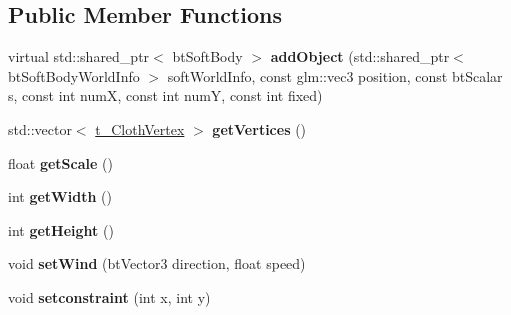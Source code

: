 \subsection*{Public Member Functions}
\begin{DoxyCompactItemize}
\item 
virtual std\+::shared\+\_\+ptr$<$ bt\+Soft\+Body $>$ {\bfseries add\+Object} (std\+::shared\+\_\+ptr$<$ bt\+Soft\+Body\+World\+Info $>$ soft\+World\+Info, const glm\+::vec3 position, const bt\+Scalar s, const int numX, const int numY, const int fixed)\hypertarget{class_physics_1_1_cloth_physic_object_a78923cc91aae2576f71de7e1cfc1ef2b}{}\label{class_physics_1_1_cloth_physic_object_a78923cc91aae2576f71de7e1cfc1ef2b}

\item 
std\+::vector$<$ \hyperlink{struct_physics_1_1_physic_object_1_1t___cloth_vertex}{t\+\_\+\+Cloth\+Vertex} $>$ {\bfseries get\+Vertices} ()\hypertarget{class_physics_1_1_cloth_physic_object_a16c6ad9efd297a4f130bb4b91da4688f}{}\label{class_physics_1_1_cloth_physic_object_a16c6ad9efd297a4f130bb4b91da4688f}

\item 
float {\bfseries get\+Scale} ()\hypertarget{class_physics_1_1_cloth_physic_object_a3febd3bda1ef9e8e93e94cc492b08cb8}{}\label{class_physics_1_1_cloth_physic_object_a3febd3bda1ef9e8e93e94cc492b08cb8}

\item 
int {\bfseries get\+Width} ()\hypertarget{class_physics_1_1_cloth_physic_object_a1fe5c3095c7a9189f748c937f5a38035}{}\label{class_physics_1_1_cloth_physic_object_a1fe5c3095c7a9189f748c937f5a38035}

\item 
int {\bfseries get\+Height} ()\hypertarget{class_physics_1_1_cloth_physic_object_a18f471ffe72516280fdfbd94b9d86093}{}\label{class_physics_1_1_cloth_physic_object_a18f471ffe72516280fdfbd94b9d86093}

\item 
void {\bfseries set\+Wind} (bt\+Vector3 direction, float speed)\hypertarget{class_physics_1_1_cloth_physic_object_a7a62b2d5e8c4fb86b5eb8aebf40407d6}{}\label{class_physics_1_1_cloth_physic_object_a7a62b2d5e8c4fb86b5eb8aebf40407d6}

\item 
void {\bfseries setconstraint} (int x, int y)\hypertarget{class_physics_1_1_cloth_physic_object_a48b7fda6eb78e6d7fe01696553ef40be}{}\label{class_physics_1_1_cloth_physic_object_a48b7fda6eb78e6d7fe01696553ef40be}

\end{DoxyCompactItemize}

